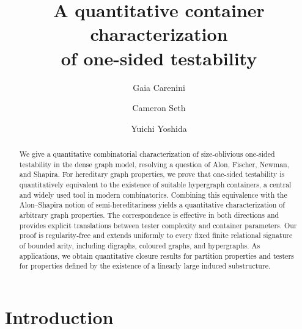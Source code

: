 \documentclass[11pt,reqno,letterpaper]{amsart}
\theoremstyle{plain}
\theoremstyle{remark}
\begin{document}

\title[A quantitative container characterization]{A quantitative container characterization \\of one-sided testability}

\author[G. Carenini]{Gaia Carenini}
\address{Trinity College Cambridge, Department of Pure Mathematics and Mathematical Statistics, Centre for Mathematical Sciences, Wilberforce Road, Cambridge CB3 0WA, United Kingdom.}

\author[C. Seth]{Cameron Seth}
\address{Cheriton School of Computer Science, University of Waterloo, 200 University Ave W, Waterloo, ON N2L 5Z5, Canada}

\author[Y. Yoshida]{Yuichi Yoshida}
\address{National Institute of Informatics (NII), 2-1-2 Hitotsubashi, Chiyoda-ku, Tokyo 101-8430, Japan.}

\begin{abstract}
We give a quantitative combinatorial characterization of size-oblivious one-sided testability in the dense graph model, resolving a question of Alon, Fischer, Newman, and Shapira. For hereditary graph properties, we prove that one-sided testability is quantitatively equivalent to the existence of suitable hypergraph containers, a central and widely used tool in modern combinatorics. Combining this equivalence with the Alon--Shapira notion of semi-hereditariness yields a quantitative characterization of arbitrary graph properties. The correspondence is effective in both directions and provides explicit translations between tester complexity and container parameters. Our proof is regularity-free and extends uniformly to every fixed finite relational signature of bounded arity, including digraphs, coloured graphs, and hypergraphs. As applications, we obtain quantitative closure results for partition properties and testers for properties defined by the existence of a linearly large induced substructure.

\end{abstract}

\maketitle

\section{Introduction}
\end{document}
